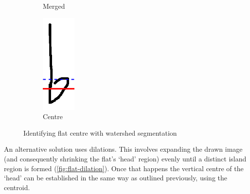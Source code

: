 \begin{figure}[H]
\begin{subfigure}[b]{.19\linewidth}
        \caption{Merged}
        \label{fig:flat-broken-merged}
    \end{subfigure}
    \begin{subfigure}[b]{.19\linewidth}
        \centering
        \includegraphics[height=5cm]{gfx/techniques/scoring/flats/6193-center.png}
        \caption{Centre}
    \end{subfigure}

  \caption{Identifying flat centre with watershed segmentation}
  \label{fig:flats-centre-watershed}
\end{figure}

An alternative solution uses dilations. This involves expanding the drawn image (and consequently shrinking the flat's `head' region) evenly until a distinct island region is formed (\cref{fig:flat-dilation}). Once that happens the vertical centre of the `head' can be established in the same way as outlined previously, using the centroid.

